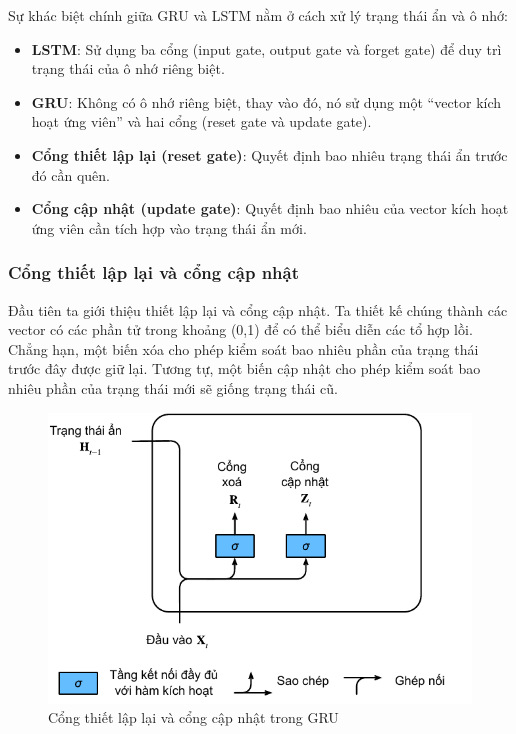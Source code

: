 \documentclass[conference]{IEEEtran}
\begin{document}
Sự khác biệt chính giữa GRU và LSTM nằm ở cách xử lý trạng thái ẩn và ô nhớ:

\begin{itemize}
    \item \textbf{LSTM}: Sử dụng ba cổng (input gate, output gate và forget gate) để duy trì trạng thái của ô nhớ riêng biệt.
    \item \textbf{GRU}: Không có ô nhớ riêng biệt, thay vào đó, nó sử dụng một “vector kích hoạt ứng viên” và hai cổng (reset gate và update gate).
\end{itemize}

\begin{itemize}
    \item \textbf{Cổng thiết lập lại (reset gate)}: Quyết định bao nhiêu trạng thái ẩn trước đó cần quên.
    \item \textbf{Cổng cập nhật (update gate)}: Quyết định bao nhiêu của vector kích hoạt ứng viên cần tích hợp vào trạng thái ẩn mới.
\end{itemize}

\subsubsection{Cổng thiết lập lại và cổng cập nhật}
Đầu tiên ta giới thiệu thiết lập lại và cổng cập nhật. Ta thiết kế chúng thành các vector có các phần tử trong khoảng  (0,1)
để có thể biểu diễn các tổ hợp lồi. Chẳng hạn, một biến xóa cho phép kiểm soát bao nhiêu phần của trạng thái trước đây được giữ lại. Tương tự, một biến cập nhật cho phép kiểm soát bao nhiêu phần của trạng thái mới sẽ giống trạng thái cũ.


\begin{figure}[H]
    \centering
    \begin{minipage}{0.43\textwidth}
        \centering
        \includegraphics[width=1\textwidth]{bibliography/figure/GRU/gru_1.pdf}
        \caption{Cổng thiết lập lại và cổng cập nhật trong GRU}
        \label{fig:gru_del_up}
    \end{minipage}
\end{figure}
\end{document}
